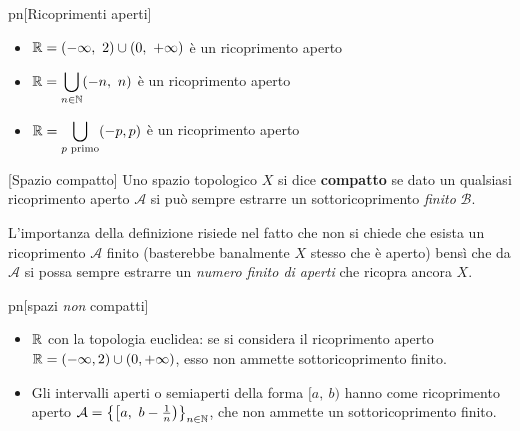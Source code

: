 \begin{example}{pn}[Ricoprimenti aperti]~{}
	\begin{itemize}
		\item $\displaystyle \R=(-\infty ,\ 2)\cup(0,\ +\infty)$ è un ricoprimento aperto
		\item $\displaystyle \mathbb{R} =\bigcup_{n\in\mathbb{N}}(-n,\ n)$ è un ricoprimento aperto
		\item $\displaystyle \mathbb{R}=\bigcup_{p \text{ primo}}(-p,p)$ è un ricoprimento aperto
	\end{itemize}
\end{example}

\begin{definition}{}[Spazio compatto]
	Uno spazio topologico $X$ si dice \textbf{compatto} se dato un qualsiasi ricoprimento aperto $\mathcal{A}$ si può sempre estrarre un sottoricoprimento \textit{finito} $\mathcal{B}$.
\end{definition}
L'importanza della definizione risiede nel fatto che non si chiede che esista un ricoprimento $\mathcal{A}$ finito (basterebbe banalmente $X$ stesso che è aperto) bensì che da $\mathcal{A}$ si possa sempre estrarre un \textit{numero finito di aperti} che ricopra ancora $X$.

\begin{example}{pn}[spazi \textit{non} compatti]~{}
	\begin{itemize}
		\item $\mathbb{R}$ con la topologia euclidea: se si considera il ricoprimento aperto $\displaystyle \mathbb{R}=(-\infty , 2)\cup(0,+\infty)$, esso non ammette sottoricoprimento finito.
		\item Gli intervalli aperti o semiaperti della forma $[a,\ b)$ hanno come ricoprimento aperto $\mathcal{A}=\left\{ \left[ a, \ b-\frac{1}{n}\right) \right\}_{n\in \N}$, che non ammette un sottoricoprimento finito.
	\end{itemize}
\end{example}

